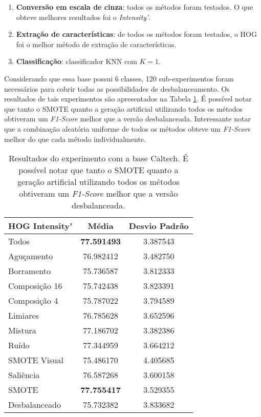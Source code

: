 \begin{enumerate}
\item \textbf{Conversão em escala de cinza}: todos os métodos foram testados. O que obteve melhores resultados foi o \textit{Intensity'}.
\item \textbf{Extração de características}: de todos os métodos foram testados, o HOG foi o melhor método de extração de características.
\item \textbf{Classificação}: classificador KNN com $K=1$.
\end{enumerate}


Considerando que essa base possui 6 classes, 120 sub-experimentos foram necessários para cobrir todas as possibilidades de desbalanceamento. Os resultados de tais experimentos são apresentados na Tabela \ref{tab:resultados:3.2}. É possível notar que tanto o SMOTE quanto a geração artificial utilizando todos os métodos obtiveram um \textit{F1-Score} melhor que a versão desbalanceada. Interessante notar que a combinação aleatória uniforme de todos os métodos obteve um \textit{F1-Score} melhor do que cada método individualmente.

\begin{table}[H]
\begin{center}
\caption{Resultados do experimento com a base Caltech. É possível notar que tanto o SMOTE quanto a geração artificial utilizando todos os métodos obtiveram um \textit{F1-Score} melhor que a versão desbalanceada.}
\label{tab:resultados:3.2}
\begin{tabular}{|l|c|c|}
\hline
\textbf{HOG Intensity'} & \textbf{Média}     & \textbf{Desvio Padrão} \\ \hline
   Todos        &  \textbf{77.591493} &  3.387543  \\ \hline
  Aguçamento    &  76.982412 &  3.482750  \\ \hline
  Borramento    &  75.736587 &  3.812333  \\ \hline
  Composição 16 &  75.742438 &  3.823391  \\ \hline
  Composição 4  &  75.787022 &  3.794589  \\ \hline
  Limiares      &  76.785628 &  3.652596  \\ \hline
  Mistura       &  77.186702 &  3.382386  \\ \hline
  Ruído         &  77.344959 &  3.664212  \\ \hline
  SMOTE Visual  &  75.486170 &  4.405685  \\ \hline
  Saliência     &  76.587268 &  3.600158  \\ \hline
 SMOTE          &  \textbf{77.755417} &  3.529355  \\ \hline
Desbalanceado   &  75.732382 &  3.833682  \\ \hline
\end{tabular}
\end{center}
\end{table}

